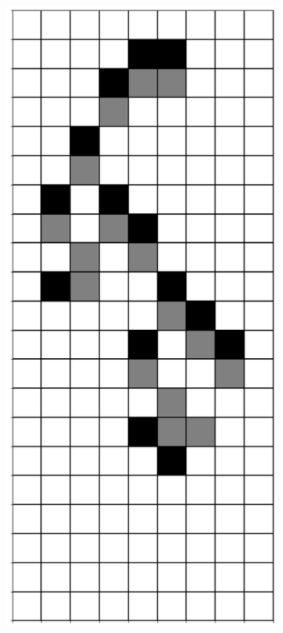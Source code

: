 \documentclass[12pt]{article}
\numberwithin{figure}{section} %
\begin{document}
\begin{figure}[H]
\begin{subfigure}{0.19\textwidth}
     \subcaption{}
   \end{subfigure}
           \begin{subfigure}{0.19\textwidth}
     \centering
     \includegraphics[width=\linewidth]{Section4/25.4}

\end{subfigure}
\end{figure}
\end{document}
